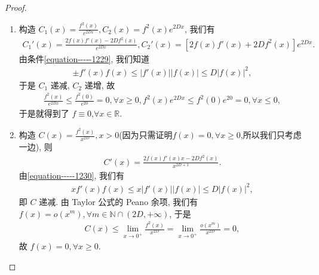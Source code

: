 \documentclass[../../main.tex]{subfiles}%
\begin{document}
\begin{proof}
\begin{enumerate}
\item 构造 $C_1(x)=\frac{f^2(x)}{e^{2Dx}},C_2(x)=f^2(x)e^{2Dx}$, 我们有
\begin{align*}
C_1'(x)=\frac{2f(x)f'(x)-2Df^2(x)}{e^{2Dx}},C_2'(x)=[2f(x)f'(x)+2Df^2(x)]e^{2Dx}.
\end{align*}
由条件\eqref{equation-----1229}, 我们知道
\begin{align*}
\pm f'(x)f(x)\leqslant|f'(x)||f(x)|\leqslant D|f(x)|^2,
\end{align*}
于是 $C_1$ 递减, $C_2$ 递增, 故
\begin{align*}
\frac{f^2(x)}{e^{2Dx}}\leqslant\frac{f^2(0)}{e^{20}}=0,\forall x\geqslant0,f^2(x)e^{2Dx}\leqslant f^2(0)e^{20}=0,\forall x\leqslant0,
\end{align*}
于是就得到了 $f\equiv0$,$\forall x\in \mathbb{R}$.

\item 构造 $C(x)=\frac{f^2(x)}{x^{2D}},x>0$(因为只需证明$f(x)=0,\forall x\geqslant0$,所以我们只考虑一边), 则
\begin{align*}
C'(x)=\frac{2f(x)f'(x)x - 2Df^2(x)}{x^{2D + 1}}.
\end{align*}
由\eqref{equation-----1230}, 我们有
\begin{align*}
xf'(x)f(x)\leqslant x|f'(x)||f(x)|\leqslant D|f(x)|^2,
\end{align*}
即 $C$ 递减. 由 Taylor 公式的 Peano 余项, 我们有 $f(x)=o(x^m),\forall m\in\mathbb{N}\cap (2D,+\infty)$, 于是 
\begin{align*}
C(x)\leqslant \lim_{x\rightarrow 0^+} \frac{f^2(x)}{x^{2D}}=\lim_{x\rightarrow 0^+} \frac{o\left( x^m \right)}{x^{2D}}=0,
\end{align*}
故 $f(x)=0,\forall x\geqslant0$. 
\end{enumerate}

\end{proof}
\end{document}
